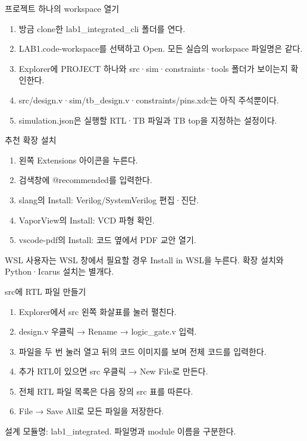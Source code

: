 \begin{frame}{프로젝트 하나의 workspace 열기}\relax
\small
\begin{enumerate}\setlength{\itemsep}{0.22cm}
\item 방금 clone한 lab1\_integrated\_cli 폴더를 연다.
\item LAB1.code-workspace를 선택하고 Open. 모든 실습의 workspace 파일명은 같다.
\item Explorer에 PROJECT 하나와 src·sim·constraints·tools 폴더가 보이는지 확인한다.
\item src/design.v·sim/tb\_design.v·constraints/pins.xdc는 아직 주석뿐이다.
\item simulation.json은 실행할 RTL·TB 파일과 TB top을 지정하는 설정이다.
\end{enumerate}

\end{frame}

\begin{frame}{추천 확장 설치}\relax
\small
\begin{enumerate}\setlength{\itemsep}{0.22cm}
\item 왼쪽 Extensions 아이콘을 누른다.
\item 검색창에 @recommended를 입력한다.
\item slang의 Install: Verilog/SystemVerilog 편집·진단.
\item VaporView의 Install: VCD 파형 확인.
\item vscode-pdf의 Install: 코드 옆에서 PDF 교안 열기.
\end{enumerate}
WSL 사용자는 WSL 창에서 필요할 경우 Install in WSL을 누른다. 확장 설치와 Python·Icarus 설치는 별개다.\par
\end{frame}

\begin{frame}{src에 RTL 파일 만들기}\relax
\small
\begin{enumerate}\setlength{\itemsep}{0.22cm}
\item Explorer에서 src 왼쪽 화살표를 눌러 펼친다.
\item design.v 우클릭 → Rename → logic\_gate.v 입력.
\item 파일을 두 번 눌러 열고 뒤의 코드 이미지를 보며 전체 코드를 입력한다.
\item 추가 RTL이 있으면 src 우클릭 → New File로 만든다.
\item 전체 RTL 파일 목록은 다음 장의 src 표를 따른다.
\item File → Save All로 모든 파일을 저장한다.
\end{enumerate}
설계 모듈명: lab1\_integrated. 파일명과 module 이름을 구분한다.\par
\end{frame}

